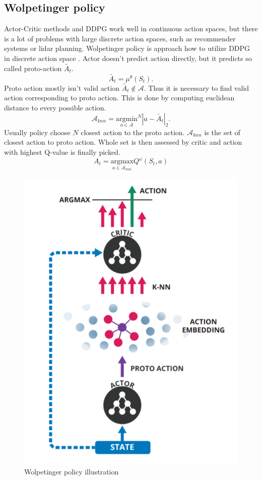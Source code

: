 \subsection{Wolpetinger policy}
Actor-Critic methods and DDPG work well in continuous action spaces, but there is a lot of problems with large discrete action spaces, such as recommender systems or lidar planning. Wolpetinger policy is approach how to utilize DDPG in discrete action space \cite{dulac2015}. Actor doesn't predict action directly, but it predicts so called proto-action $\tilde{A_t}$.
\begin{equation}
\tilde{A_t} = \mu^\theta(S_t).
\end{equation}
Proto action mostly isn't valid action $\tilde{A_t} \notin \mathcal{A}$. Thus it is necessary to find valid action corresponding to proto action. This is done by computing euclidean distance to every possible action.
\begin{equation}
\mathcal{A}_{knn} = \underset{a \in \mathcal{A}}{\text{argmin}}^N | a - \tilde{A_t} |_2 .
\end{equation}
Usually policy choose $N$ closest action to the proto action. $\mathcal{A}_{knn}$ is the set of closest action to proto action. Whole set is then assessed by critic and action with highest Q-value is finally picked.
\begin{equation}
A_t = \underset{a \in \mathcal{A}_{knn}}{\text{argmax}} Q^\omega(S_t, a)
\end{equation}
\begin{figure}[!h]
\centering
\includegraphics[scale=0.35]{fig/wolpetinger-policy.png}
\caption{Wolpetinger policy illustration}
\end{figure}

